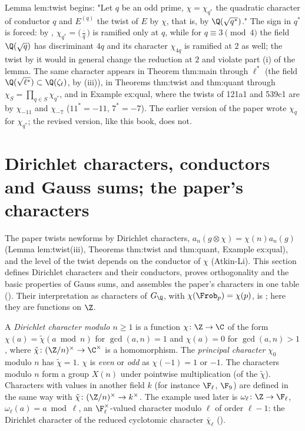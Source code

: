 \begin{paperlink}\label{pl:rings:twist}
Lemma lem:twist begins: "Let $q$ be an odd prime, $\chi=\chi_{q^*}$ the quadratic character of conductor $q$ and $E^{(q)}$ the twist of $E$ by $\chi$, that
is, by $\Q(\sqrt{q^*})$." The sign in $q^*$ is forced: by , $\chi_{q^*}=\bigl(\frac\cdot q\bigr)$ is ramified only at $q$, while for $q\equiv3\pmod4$ the
field $\Q(\sqrt q)$ has discriminant $4q$ and its character $\chi_{4q}$ is ramified at $2$ as well; the twist by it would in general change the reduction at
$2$ and violate part (i) of the lemma. The same character appears in Theorem thm:main through $\ell^*$ (the field $\Q(\sqrt{\ell^*})\subset\Q(\zeta_\ell)$, by
(iii)), in Theorems thm:twist and thm:quant through $\chi_S=\prod_{q\in S}\chi_{q^*}$, and in Example ex:qual, where
the twists of 121a1 and 539c1 are by $\chi_{-11}$ and $\chi_{-7}$ ($11^*=-11$, $7^*=-7$). The earlier version of the paper wrote $\chi_q$ for
$\chi_{q^*}$; the revised version, like this book, does not.
\end{paperlink}

\section[Dirichlet characters and Gauss sums]{Dirichlet characters, conductors and Gauss sums; the paper's characters}\label{sec:rings:dirichlet}

The paper twists newforms by Dirichlet characters, $a_n(g\otimes\chi)=\chi(n)a_n(g)$ (Lemma lem:twist(iii), Theorems thm:twist and
thm:quant, Example ex:qual), and the level of the twist depends on the conductor of $\chi$ (Atkin-Li). This section defines
Dirichlet characters and their conductors, proves orthogonality and the basic properties of Gauss sums, and
assembles the paper's characters in one table (). Their interpretation as characters of
$G_\Q$, with $\chi(\Frob_p)=\chi(p)$, is ; here they are functions on $\Z$.

\begin{definition}\label{def:rings:dirichlet}
A \emph{Dirichlet character modulo $n\ge1$} is a function $\chi\colon\Z\to\C$ of the form $\chi(a)=\tilde\chi(a\bmod n)$ for $\gcd(a,n)=1$ and $\chi(a)=0$ for
$\gcd(a,n)>1$, where $\tilde\chi\colon(\Z/n)^\times\to\C^\times$ is a homomorphism. The \emph{principal character} $\chi_0$ modulo $n$ has $\tilde\chi=1$. $\chi$ is \emph{even} or
\emph{odd} as $\chi(-1)=1$ or $-1$. The characters modulo $n$ form a group $X(n)$ under pointwise multiplication (of the $\tilde\chi$). Characters
with values in another field $k$ (for instance $\F_\ell$, $\F_9$) are defined in the same way with $\tilde\chi\colon(\Z/n)^\times\to k^\times$. The example used later is
$\omega_\ell\colon\Z\to\F_\ell$, $\omega_\ell(a)=a\bmod\ell$, an $\F_\ell^\times$-valued character modulo $\ell$ of order $\ell-1$: the Dirichlet character of the reduced
cyclotomic character $\bar\chi_\ell$ ().
\end{definition}

